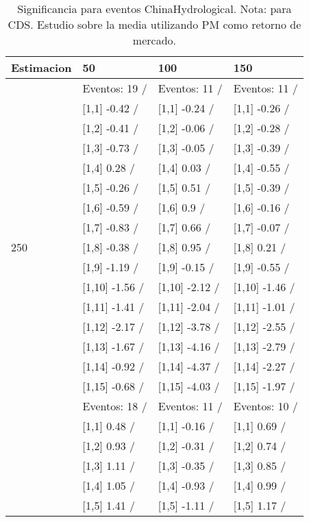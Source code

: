 \begin{table}

\caption{Significancia para eventos ChinaHydrological. Nota: para CDS. Estudio sobre la media utilizando PM como retorno de mercado.}
\centering
\begin{tabular}[t]{llll}
\toprule
Estimacion & 50 & 100 & 150\\
\midrule
 & Eventos:  19 / & Eventos:  11 / & Eventos:  11 /\\
 & {}[1,1] -0.42  / & {}[1,1] -0.24  / & {}[1,1] -0.26  /\\
 & {}[1,2] -0.41  / & {}[1,2] -0.06  / & {}[1,2] -0.28  /\\
 & {}[1,3] -0.73  / & {}[1,3] -0.05  / & {}[1,3] -0.39  /\\
 & {}[1,4] 0.28  / & {}[1,4] 0.03  / & {}[1,4] -0.55  /\\
\addlinespace
 & {}[1,5] -0.26  / & {}[1,5] 0.51  / & {}[1,5] -0.39  /\\
 & {}[1,6] -0.59  / & {}[1,6] 0.9  / & {}[1,6] -0.16  /\\
 & {}[1,7] -0.83  / & {}[1,7] 0.66  / & {}[1,7] -0.07  /\\
250 & {}[1,8] -0.38  / & {}[1,8] 0.95  / & {}[1,8] 0.21  /\\
 & {}[1,9] -1.19  / & {}[1,9] -0.15  / & {}[1,9] -0.55  /\\
\addlinespace
 & {}[1,10] -1.56  / & {}[1,10] -2.12  / & {}[1,10] -1.46  /\\
 & {}[1,11] -1.41  / & {}[1,11] -2.04  / & {}[1,11] -1.01  /\\
 & {}[1,12] -2.17  / & {}[1,12] -3.78  / & {}[1,12] -2.55  /\\
 & {}[1,13] -1.67  / & {}[1,13] -4.16  / & {}[1,13] -2.79  /\\
 & {}[1,14] -0.92  / & {}[1,14] -4.37  / & {}[1,14] -2.27  /\\
\addlinespace
 & {}[1,15] -0.68  / & {}[1,15] -4.03  / & {}[1,15] -1.97  /\\
 & Eventos:  18 / & Eventos:  11 / & Eventos:  10 /\\
 & {}[1,1] 0.48  / & {}[1,1] -0.16  / & {}[1,1] 0.69  /\\
 & {}[1,2] 0.93  / & {}[1,2] -0.31  / & {}[1,2] 0.74  /\\
 & {}[1,3] 1.11  / & {}[1,3] -0.35  / & {}[1,3] 0.85  /\\
\addlinespace
 & {}[1,4] 1.05  / & {}[1,4] -0.93  / & {}[1,4] 0.99  /\\
 & {}[1,5] 1.41  / & {}[1,5] -1.11  / & {}[1,5] 1.17  /\\

\end{tabular}
\end{table}
